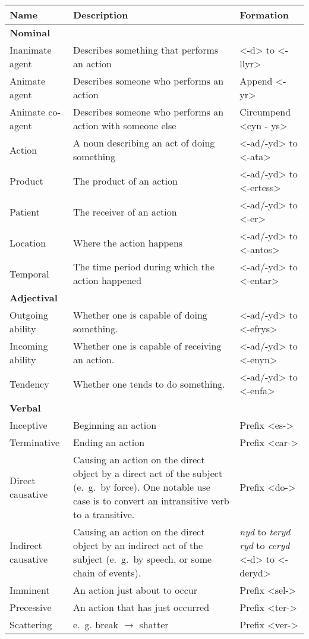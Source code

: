 \documentclass{book}
\makeatletter
\newcommand{\specialcell}[2][l]{%
	\begin{tabular}[#1]{@{}l@{}}#2\end{tabular}}
\makeatother
\begin{document}
\begin{center}
  \begin{longtable}{|l|p{4cm}|p{4cm}|}
    \hline
    Name & Description & Formation \\ \hline
		\endhead
    \textbf{Nominal} & & \\
    Inanimate agent & Describes something that performs an action & <-d> to <-llyr> \\
    Animate agent & Describes someone who performs an action & Append <-yr> \\
    Animate co-agent & Describes someone who performs an action with someone else & Circumpend <cyn - ys> \\
    Action & A noun describing an act of doing something & <-ad/-yd> to <-ata> \\
    Product & The product of an action & <-ad/-yd> to <-ertess> \\
    Patient & The receiver of an action & <-ad/-yd> to <-er> \\
    Location & Where the action happens & <-ad/-yd> to <-antos> \\
    Temporal & The time period during which the action happened & <-ad/-yd> to <-entar> \\ \hline
    \textbf{Adjectival} & & \\
    Outgoing ability & Whether one is capable of doing something. & <-ad/-yd> to <-efrys> \\
    Incoming ability & Whether one is capable of receiving an action. & <-ad/-yd> to <-enyn> \\
    Tendency & Whether one tends to do something. & <-ad/-yd> to <-enfa> \\ \hline
    \textbf{Verbal} & & \\
    Inceptive & Beginning an action & Prefix <es-> \\
    Terminative & Ending an action & Prefix <car-> \\
    Direct causative & Causing an action on the direct object by a direct act of the subject (e.~g.~by force). One notable use case is to convert an intransitive verb to a transitive. & Prefix <do-> \\
    Indirect causative & Causing an action on the direct object by an indirect act of the subject (e.~g.~by speech, or some chain of events). & \specialcell[t]{\emph{nyd} to \emph{teryd} \\ \emph{ryd} to \emph{ceryd} \\ <-d> to <-deryd>} \\
    Imminent & An action just about to occur & Prefix <sel-> \\
    Precessive & An action that has just occurred & Prefix <ter-> \\
    Scattering & e.~g. break $\rightarrow$ shatter & Prefix <ver-> \\
    \hline
  \end{longtable}
\end{center}
\end{document}
